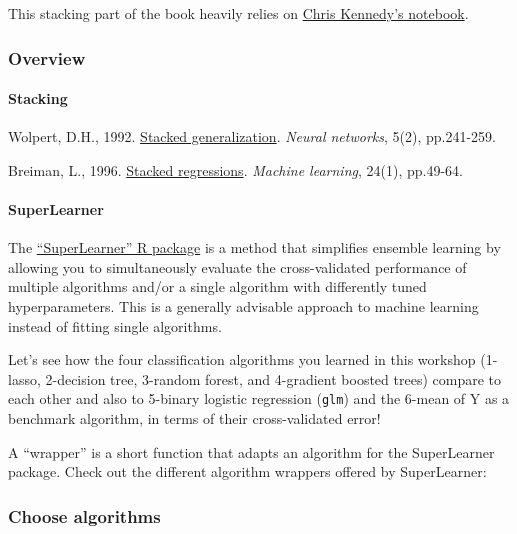 \documentclass[
]{book}
\begin{document}
This stacking part of the book heavily relies on \href{https://github.com/dlab-berkeley/Machine-Learning-in-R/blob/master/07-ensembles.Rmd}{Chris Kennedy's notebook}.

\subsubsection{Overview}\label{overview}

\paragraph{Stacking}\label{stacking}

Wolpert, D.H., 1992. \href{http://citeseerx.ist.psu.edu/viewdoc/summary?doi=10.1.1.56.1533}{Stacked generalization}. \emph{Neural networks}, 5(2), pp.241-259.

Breiman, L., 1996. \href{https://statistics.berkeley.edu/sites/default/files/tech-reports/367.pdf}{Stacked regressions}. \emph{Machine learning}, 24(1), pp.49-64.

\paragraph{SuperLearner}\label{superlearner}

The \href{https://cran.r-project.org/web/packages/SuperLearner/index.html}{``SuperLearner'' R package} is a method that simplifies ensemble learning by allowing you to simultaneously evaluate the cross-validated performance of multiple algorithms and/or a single algorithm with differently tuned hyperparameters. This is a generally advisable approach to machine learning instead of fitting single algorithms.

Let's see how the four classification algorithms you learned in this workshop (1-lasso, 2-decision tree, 3-random forest, and 4-gradient boosted trees) compare to each other and also to 5-binary logistic regression (\texttt{glm}) and the 6-mean of Y as a benchmark algorithm, in terms of their cross-validated error!

A ``wrapper'' is a short function that adapts an algorithm for the SuperLearner package. Check out the different algorithm wrappers offered by SuperLearner:

\subsubsection{Choose algorithms}\label{choose-algorithms}
\end{document}
